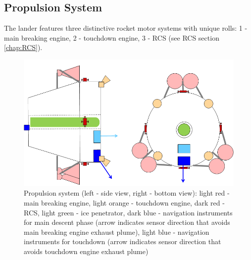 \subsection{Propulsion System}
The lander features three distinctive rocket motor systems with unique rolls: 1 - main breaking engine, 2 - touchdown engine, 3 - RCS (see RCS section \ref{chap:RCS}).

\begin{figure}[htb]
	\centering
	\includegraphics[width=\textwidth]{Lander/aaronlanderprop}
	\caption{Propulsion system (left - side view, right - bottom view): light red - main breaking engine, light orange - touchdown engine, dark red - RCS, light green - ice penetrator, dark blue - navigation instruments for main descent phase (arrow indicates sensor direction that avoids main breaking engine exhaust plume), light blue - navigation instruments for touchdown (arrow indicates sensor direction that avoids touchdown engine exhaust plume)\label{fig:alanderprop}}
\end{figure}

